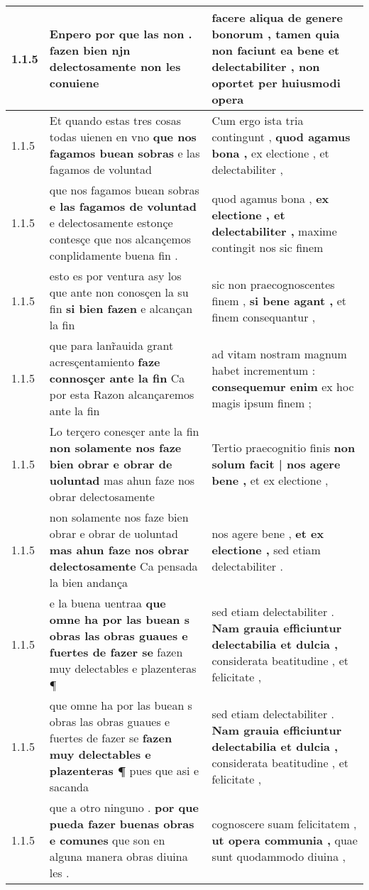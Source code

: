 \begin{tabular}{|p{1cm}|p{6.5cm}|p{6.5cm}|}
1.1.5 & Enpero por que las non . \textbf{ fazen bien njn } delectosamente non les conuiene & facere aliqua de genere bonorum , \textbf{ tamen quia non faciunt ea bene et delectabiliter , } non oportet per huiusmodi opera \\\hline
1.1.5 & Et quando estas tres cosas todas uienen en vno \textbf{ que nos fagamos buean sobras } e las fagamos de voluntad & Cum ergo ista tria contingunt , \textbf{ quod agamus bona , } ex electione , et delectabiliter , \\\hline
1.1.5 & que nos fagamos buean sobras \textbf{ e las fagamos de voluntad } e delectosamente estonçe contesçe que nos alcançemos conplidamente buena fin . & quod agamus bona , \textbf{ ex electione , et delectabiliter , } maxime contingit nos sic finem \\\hline
1.1.5 & esto es por ventura asy los que ante non conosçen la su fin \textbf{ si bien fazen } e alcançan la fin & sic non praecognoscentes finem , \textbf{ si bene agant , } et finem consequantur , \\\hline
1.1.5 & que para lanr̃auida grant acresçentamiento \textbf{ faze connosçer ante la fin } Ca por esta Razon alcançaremos ante la fin & ad vitam nostram magnum habet incrementum : \textbf{ consequemur enim } ex hoc magis ipsum finem ; \\\hline
1.1.5 & Lo terçero conesçer ante la fin \textbf{ non solamente nos faze bien obrar e obrar de uoluntad } mas ahun faze nos obrar delectosamente & Tertio praecognitio finis \textbf{ non solum facit | nos agere bene , } et ex electione , \\\hline
1.1.5 & non solamente nos faze bien obrar e obrar de uoluntad \textbf{ mas ahun faze nos obrar delectosamente } Ca pensada la bien andança & nos agere bene , \textbf{ et ex electione , } sed etiam delectabiliter . \\\hline
1.1.5 & e la buena uentraa \textbf{ que omne ha por las buean s obras las obras guaues e fuertes de fazer se } fazen muy delectables e plazenteras ¶ & sed etiam delectabiliter . \textbf{ Nam grauia efficiuntur delectabilia et dulcia , } considerata beatitudine , et felicitate , \\\hline
1.1.5 & que omne ha por las buean s obras las obras guaues e fuertes de fazer se \textbf{ fazen muy delectables e plazenteras ¶ } pues que asi e sacanda & sed etiam delectabiliter . \textbf{ Nam grauia efficiuntur delectabilia et dulcia , } considerata beatitudine , et felicitate , \\\hline
1.1.5 & que a otro ninguno . \textbf{ por que pueda fazer buenas obras e comunes } que son en alguna manera obras diuina les . & cognoscere suam felicitatem , \textbf{ ut opera communia , } quae sunt quodammodo diuina , \\\hline

\end{tabular}
